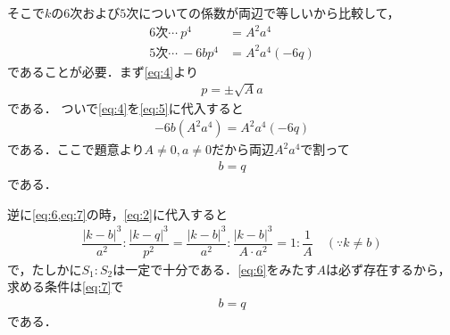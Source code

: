 \documentclass[../../main.tex]{subfiles}
\begin{document}
そこで$k$の$6$次および$5$次についての係数が両辺で等しいから比較して，
\begin{align}
  6\text{次}\cdots\ p^4&=A^2a^4 \label{eq:4}\\
  5\text{次}\cdots\ -6bp^4&=A^2a^4(-6q) \label{eq:5}
\end{align}
であることが必要．まず\cref{eq:4}より
\begin{align}
  p = \pm \sqrt{A}a \label{eq:6}
\end{align}
である．
ついで\cref{eq:4}を\cref{eq:5}に代入すると
\begin{align}
  -6b\left(A^2a^4\right) = A^2a^4(-6q)
\end{align}
である．ここで題意より$A\ne0,a\ne0$だから両辺$A^2a^4$で割って
\begin{align}
  b = q \label{eq:7}
\end{align}
である．

逆に\cref{eq:6,eq:7}の時，\cref{eq:2}に代入すると
\begin{align}
  \dfrac{|k-b|^3}{a^2}:\dfrac{|k-q|^3}{p^2}=\dfrac{|k-b|^3}{a^2}:\dfrac{|k-b|^3}{A\cdot a^2}=1:\dfrac{1}{A} \quad(\because k\ne b)
\end{align}
で，たしかに$S_1:S_2$は一定で十分である．\cref{eq:6}をみたす$A$は必ず存在するから，求める条件は\cref{eq:7}で
\begin{align}
  b=q
\end{align}
である．

\newpage
\end{document}
